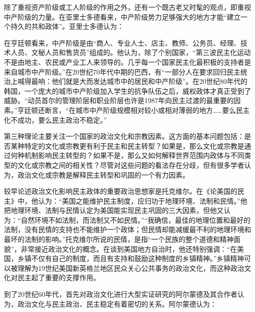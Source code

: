 除了重视资产阶级或工人阶级的作用之外，还有一个既古老又时髦的观点，即重视中产阶级的力量。在亚里士多德看来，中产阶级势力足够强大的地方才能“建立一个持久的共和政体”。亚里士多德认为：


在亨廷顿看来，中产阶级是由“商人、专业人士、店主、教师、公务员、经理、技术人员、文秘人员和售货员”组成的。他认为，除了个别国家，“第三波民主化运动不是由地主、农民或产业工人来领导的。几乎每一个国家民主化最积极的支持者是来自城市中产阶级。”在20世纪70年代中期的巴西，有“一部分人在要求回归民主统治上喊得最响：他们就是大而发达城市中的居民和中产阶级”。在20世纪80年代的韩国，一个庞大的城市中产阶级加入学生的抗争队伍之后，威权政体才真正受到了威胁。“动员首尔的管理阶层和职业阶层也许是1987年向民主过渡的最重要的因素。”亨廷顿还断言，“在城市中产阶级规模相对较小或相对薄弱的地方……要么民主化不成功，要么民主政治不稳定。”


第三种理论主要关注一个国家的政治文化和宗教因素。这方面的基本问题包括：是否某种特定的文化或宗教更有利于民主和民主转型？如果是，那么文化或宗教是通过何种机制影响民主转型的？如果不是，那么又如何解释世界范围内政体与不同类型的文化或宗教之间的相关性？尽管对这些问题的看法存在分歧，但有很多学者认为，政治文化或宗教是解释民主转型和巩固的一个有力因素。

较早论述政治文化影响民主政体的重要政治思想家是托克维尔。在《论美国的民主》中，他认为：“美国之能维护民主制度，应归功于地理环境、法制和民情。”他把地理环境、法制与民情认定为美国能实现民主巩固的三大因素，但他又认为：“自然环境不如法制，而法制又不如民情。”“我确信，最佳的地理位置和最好的法制，没有民情的支持也不能维护一个政体；但民情却能减缓最不利的地理环境和最坏的法制的影响。”托克维尔所说的民情，是指“一个民族的整个道德和精神面貌”，非常接近政治文化的概念。在谈到美国地方自治时，他还特别强调：“在美国，乡镇不仅有自己的制度，而且有支持和鼓励这种制度的乡镇精神。”乡镇精神可以被理解为19世纪美国新英格兰地区民众关心公共事务的政治文化，而这种政治文化对民主起了重要的支撑作用。

到了20世纪60年代，首先对政治文化进行大型实证研究的阿尔蒙德及其合作者认为，政治文化与民主政治、民主稳定有着密切的关系。阿尔蒙德认为：

